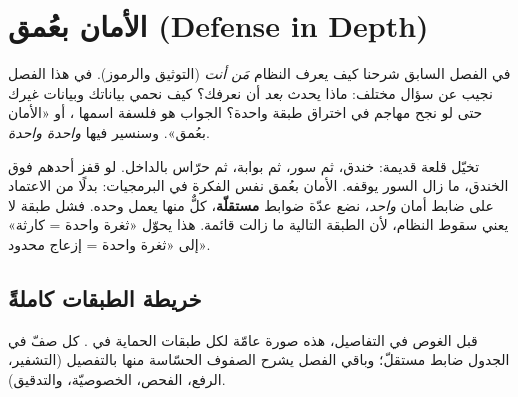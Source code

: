\section{الأمان بعُمق (Defense in Depth)}

في الفصل السابق شرحنا كيف يعرف النظام \emph{مَن أنت} (التوثيق والرموز). في هذا
الفصل نجيب عن سؤال مختلف: ماذا يحدث \emph{بعد} أن نعرفك؟ كيف نحمي بياناتك وبيانات
غيرك حتى لو نجح مهاجم في اختراق طبقة واحدة؟ الجواب هو فلسفة اسمها ، أو «الأمان بعُمق». وسنسير فيها \emph{واحدة واحدة}.

\begin{idea}
تخيّل قلعة قديمة: خندق، ثم سور، ثم بوابة، ثم حرّاس بالداخل. لو قفز أحدهم فوق
الخندق، ما زال السور يوقفه. الأمان بعُمق نفس الفكرة في البرمجيات: بدلًا من الاعتماد
على ضابط أمان \emph{واحد}، نضع عدّة ضوابط \textbf{مستقلّة}، كلٌّ منها يعمل وحده. فشل
طبقة لا يعني سقوط النظام، لأن الطبقة التالية ما زالت قائمة. هذا يحوّل «ثغرة واحدة =
كارثة» إلى «ثغرة واحدة = إزعاج محدود».
\end{idea}

\subsection{خريطة الطبقات كاملةً}

قبل الغوص في التفاصيل، هذه صورة عامّة لكل طبقات الحماية في . كل صفّ
في الجدول ضابط مستقلّ؛ وباقي الفصل يشرح الصفوف الحسّاسة منها بالتفصيل (التشفير،
الرفع، الفحص، الخصوصيّة، والتدقيق).

